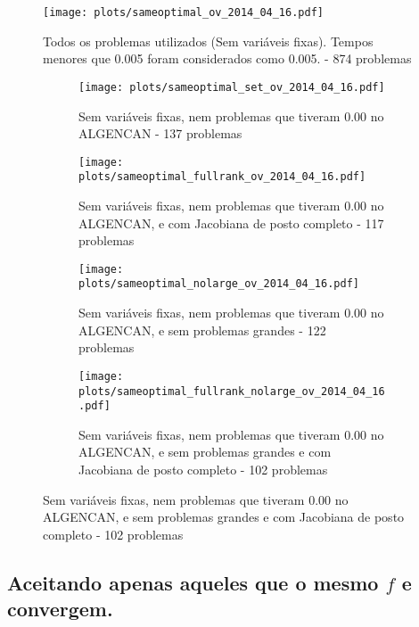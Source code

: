\documentclass{article}
\begin{document}
\begin{figure}[H]
  \centering
  \texttt{[image: plots/sameoptimal\_ov\_2014\_04\_16.pdf]}
  \caption{Todos os problemas utilizados (Sem variáveis fixas). Tempos menores
    que 0.005 foram considerados como 0.005. - 874 problemas}
\end{figure}
\begin{figure}[H]
  \centering
  \begin{subfigure}{0.48\textwidth}
    \texttt{[image: plots/sameoptimal\_set\_ov\_2014\_04\_16.pdf]}
    \caption{Sem variáveis fixas, nem problemas
      que tiveram 0.00 no ALGENCAN - 137 problemas}
  \end{subfigure}
  \begin{subfigure}{0.48\textwidth}
    \texttt{[image: plots/sameoptimal\_fullrank\_ov\_2014\_04\_16.pdf]}
    \caption{Sem variáveis fixas, nem problemas
      que tiveram 0.00 no ALGENCAN, e com Jacobiana de posto completo - 117
      problemas}
  \end{subfigure}
  \begin{subfigure}{0.48\textwidth}
    \texttt{[image: plots/sameoptimal\_nolarge\_ov\_2014\_04\_16.pdf]}
    \caption{Sem variáveis fixas, nem problemas
      que tiveram 0.00 no ALGENCAN, e sem problemas grandes - 122 problemas}
  \end{subfigure}
  \begin{subfigure}{0.48\textwidth}
    \texttt{[image: plots/sameoptimal\_fullrank\_nolarge\_ov\_2014\_04\_16.pdf]}
    \caption{Sem variáveis fixas, nem problemas
      que tiveram 0.00 no ALGENCAN, e sem problemas grandes e com Jacobiana de
      posto completo - 102 problemas}
  \end{subfigure}
\end{figure}



\subsection{Aceitando apenas aqueles que o mesmo $f$ e convergem. }
\end{document}
